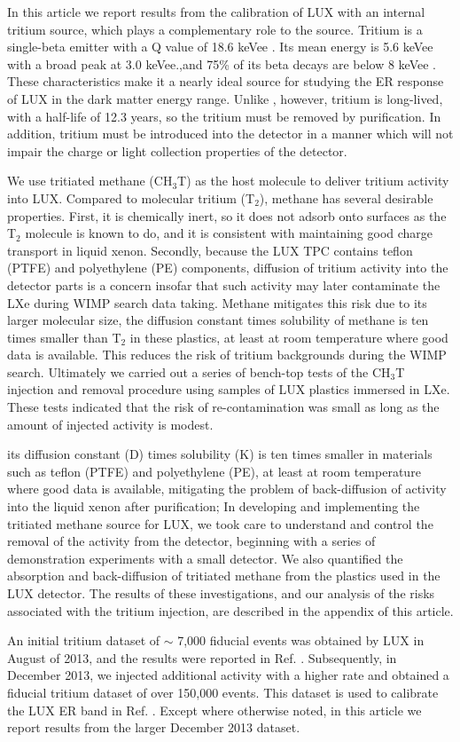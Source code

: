 In this article we report results from the calibration of LUX with an internal tritium source, which plays a complementary role to the \krsrc source. Tritium is a single-beta emitter with a Q value of 18.6 keVee \cite{Tritium_Q}. Its mean energy is 5.6 keVee \cite{Tritium_Mean} with a broad peak at 3.0 keVee.,and 75\% of its beta decays are below 8 keVee \cite{Tritium_Eq}. These characteristics make it a nearly ideal source for studying the ER response of LUX in the dark matter energy range. Unlike \krsrc, however, tritium is long-lived, with a half-life of 12.3 years\cite{Tritium_halflife_all}, so the tritium must be removed by purification. In addition, tritium must be introduced into the detector in a manner which will not impair the charge or light collection properties of the detector. 

We use tritiated methane (CH$_3$T) as the host molecule to deliver tritium activity into LUX. Compared to molecular tritium (T$_2$), methane has several desirable properties. First, it is chemically inert, so it does not adsorb onto surfaces as the T$_2$ molecule is known to do, and it is consistent with maintaining good charge transport in liquid xenon. Secondly, because the LUX TPC contains teflon (PTFE) and polyethylene (PE) components, diffusion of tritium activity into the detector parts is a concern insofar that such activity may later contaminate the LXe during WIMP search data taking. Methane mitigates this risk due to its larger molecular size, the diffusion constant times solubility of methane is ten times smaller than T$_2$ in these plastics, at least at room temperature where good data is available. This reduces the risk of tritium backgrounds during the WIMP search. Ultimately we carried out a series of bench-top tests of the CH$_3$T injection and removal procedure using samples of LUX plastics immersed in LXe. These tests indicated that the risk of re-contamination was small as long as the amount of injected activity is modest.

 its diffusion constant (D) times solubility (K) is ten times smaller in materials such as teflon (PTFE) and polyethylene (PE)\cite{miyake:1983}, at least at room temperature where good data is available, mitigating the problem of back-diffusion of activity into the liquid xenon after purification;  In developing and implementing the tritiated methane source for LUX, we took care to understand and control the removal of the activity from the detector, beginning with a series of demonstration experiments with a small detector. We also quantified the absorption and back-diffusion of tritiated methane from the plastics used in the LUX detector. The results of these investigations, and our analysis of the risks associated with the tritium injection, are described in the appendix of this article.

An initial tritium dataset of $\sim$ 7,000 fiducial events was obtained by LUX in August of 2013, and the results were reported in Ref. \cite{lux-results}. Subsequently, in December 2013, we injected additional activity with a higher rate and obtained a fiducial tritium dataset of over 150,000 events. This dataset is used to calibrate the LUX ER band in Ref. \cite{lux-reanalysis}. Except where otherwise noted, in this article we report results from the larger December 2013 dataset.